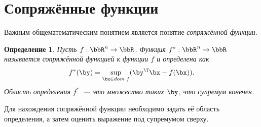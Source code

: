 \documentclass[12pt]{article}
\newtheorem{Def}{ Определение}
\begin{document}
\section{Сопряжённые функции}
Важным общематематическим понятием является понятие \emph{сопряжённой функции}. 
\begin{Def}
Пусть $f: \bbR^n \rightarrow \bbR$. 
Функция $f^*: \bbR^n \rightarrow \bbR$ называется сопряжённой функцией к функции $f$ и определена как
\vspace{-4mm}
\[
f^*(\by) = \sup\limits_{\bx \in dom \; f} (\by^{\T}\bx - f(\bx)).
\vspace{-3mm}
\]
Область определения $f^*$~--- это множество таких $\by$, что супремум конечен.
\end{Def}
Для нахождения сопряжённой функции необходимо задать её область определения, а затем оценить выражение под супремумом сверху.
\end{document}
